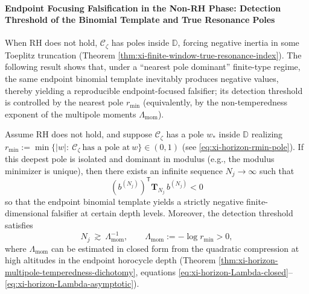 \paragraph{Endpoint Focusing Falsification in the Non-RH Phase: Detection Threshold of the Binomial Template and True Resonance Poles}
When RH does not hold, \(\mathscr{C}_{\zeta}\) has poles inside \(\mathbb{D}\), forcing negative inertia in some Toeplitz truncation (Theorem \ref{thm:xi-finite-window-true-resonance-index}).
The following result shows that, under a ``nearest pole dominant'' finite-type regime, the same endpoint binomial template inevitably produces negative values, thereby yielding a reproducible endpoint-focused falsifier; its detection threshold is controlled by the nearest pole \(r_{\min}\) (equivalently, by the non-temperedness exponent of the multipole moments \(\Lambda_{\mathrm{mom}}\)).

\begin{theorem}\label{thm:xi-endpoint-binomial-falsifier}
Assume RH does not hold, and suppose \(\mathscr{C}_{\zeta}\) has a pole \(w_\ast\) inside \(\mathbb{D}\) realizing
\(
r_{\min}:=\min\{|w|:\ \mathscr{C}_{\zeta}\ \text{has a pole at}\ w\}\in(0,1)
\)
(see \eqref{eq:xi-horizon-rmin-pole}).
If this deepest pole is isolated and dominant in modulus (e.g., the modulus minimizer is unique), then there exists an infinite sequence \(N_j\to\infty\) such that
\[
\boxed{\;
(b^{(N_j)})^{\mathsf T}\mathbf{T}_{N_j}\,b^{(N_j)}<0\;}
\]
so that the endpoint binomial template yields a strictly negative finite-dimensional falsifier at certain depth levels.
Moreover, the detection threshold satisfies
\[
N_j\ \gtrsim\ \Lambda_{\mathrm{mom}}^{-1},
\qquad
\Lambda_{\mathrm{mom}}:=-\log r_{\min}>0,
\]
where \(\Lambda_{\mathrm{mom}}\) can be estimated in closed form from the quadratic compression at high altitudes in the endpoint horocycle depth (Theorem \ref{thm:xi-horizon-multipole-temperedness-dichotomy}, equations \eqref{eq:xi-horizon-Lambda-closed}--\eqref{eq:xi-horizon-Lambda-asymptotic}).
\end{theorem}

